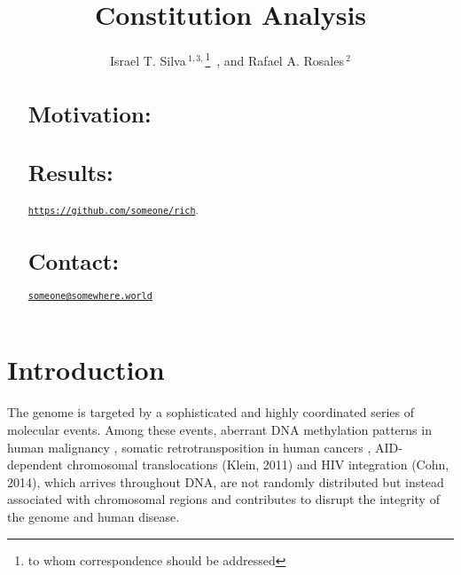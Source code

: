 \documentclass{bioinfo}
\begin{document}
\title[AID hotspots]{Constitution Analysis} 
 \author[I. T. Silva~\textit{et~al}]{%
     Israel T. Silva\,$^{1,3,}$\footnote{to
  whom correspondence should be addressed}\ , 
  and
       Rafael A. Rosales\,$^2$
  }

 \address{$^{1}$Laboratory of Molecular Immunology, The Rockefeller 
     University, 1230 York Avenue, New York, NY 10065\\
     $^{2}$Departamento de Computa\c{c}\~ao e Matem\'atica,
     Universidade de S\~ao Paulo. Av. Bandeirantes, 3900,
     Ribeir\~ao Preto,  CEP 14049-901, SP, Brazil%
}


\maketitle
\begin{abstract}
  \section{Motivation:}
  \section{Results:} 
  \href{https://github.com/someone/rich}{\texttt{https://github.com/someone/rich}}.
  \section{Contact:}
  \href{mailto:someone@somewhere.world}{\tt someone@somewhere.world}%
\end{abstract}

\section{Introduction}
The genome is targeted by a sophisticated and highly coordinated
series of molecular events. Among these events, aberrant DNA
methylation patterns in human malignancy \cite{pmid23326238}, somatic
retrotransposition in human cancers \cite{pmid22745252}, AID-dependent
chromosomal translocations (Klein, 2011) and HIV integration (Cohn,
2014), which arrives throughout DNA, are not randomly distributed but
instead associated with chromosomal regions and contributes to disrupt
the integrity of the genome and human disease. 
\end{document}
